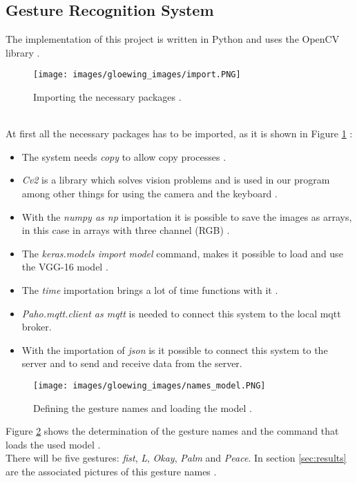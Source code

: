\subsection{Gesture Recognition System}
\label{subsec:system}
The implementation of this project is written in Python and uses the OpenCV library \cite{Brenner2018}.
\begin{figure}
\sidecaption
\texttt{[image: images/gloewing\_images/import.PNG]}
\caption{Importing the necessary packages \cite{Brenner2018}.}
\label{fig:import}
\end{figure}\\
At first all the necessary packages has to be imported, as it is shown in Figure \ref{fig:import} \cite{Brenner2018}:
\begin{itemize}
    \item The system needs \textit{copy} to allow copy processes \cite{Brenner2018}.
    \item \textit{Cv2} is a library which solves vision problems and is used in our program among other things for using the camera and the keyboard \cite{Brenner2018}.
    \item With the \textit{numpy as np} importation it is possible to save the images as arrays, in this case in arrays with three channel (RGB) \cite{Brenner2018}.
    \item The \textit{keras.models import model} command, makes it possible to load and use the VGG-16 model \cite{Brenner2018}.
    \item The \textit{time} importation brings a lot of time functions with it \cite{Brenner2018}.
    \item \textit{Paho.mqtt.client as mqtt} is needed to connect this system to the local mqtt broker.
    \item With the importation of \textit{json} is it possible to connect this system to the server and to send and receive data from the server.
\end{itemize}
\begin{figure}
\sidecaption
\texttt{[image: images/gloewing\_images/names\_model.PNG]}
\caption{Defining the gesture names and loading the model \cite{Brenner2018}.}
\label{fig:names_model}
\end{figure}
Figure \ref{fig:names_model} shows the determination of the gesture names and the command that loads the used model \cite{Brenner2018}.\\
There will be five gestures: \textit{fist}, \textit{L}, \textit{Okay}, \textit{Palm} and \textit{Peace}. In section \ref{sec:results} are the associated pictures of this gesture names \cite{Brenner2018}.\\
